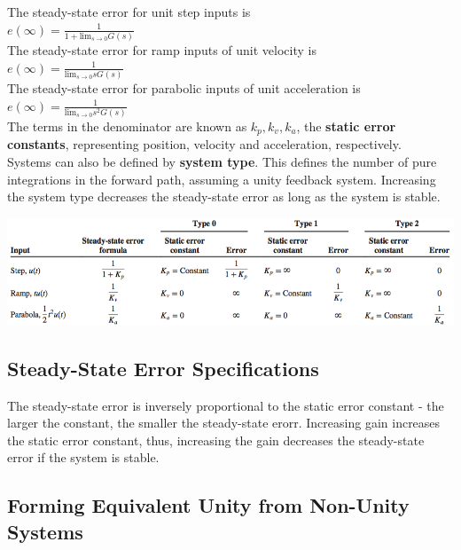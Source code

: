 \documentclass[11pt]{article}
\begin{document}
    The steady-state error for unit step inputs is \\ 

    $e(\infty) = \frac{1}{1 + \text{lim}_{s\rightarrow 0} G(s)}$ \\
    
    The steady-state error for ramp inputs of unit velocity is \\
    
    $e(\infty) = \frac{1}{\text{lim}_{s\rightarrow 0} sG(s)}$ \\

    The steady-state error for parabolic inputs of unit acceleration is \\
    
    $e(\infty) = \frac{1}{\text{lim}_{s\rightarrow 0} s^2G(s)}$ \\


    The terms in the denominator are known as $k_p, k_v, k_a$, the \textbf{static error constants}, representing position, velocity and acceleration, respectively. \\
    
    Systems can also be defined by \textbf{system type}. This defines the number of pure integrations in the forward path, assuming a unity feedback system. Increasing the system type decreases the steady-state error as long as the system is stable.

    \begin{center}
        \includegraphics[width=300 px]{img/types} \\
    \end{center}

    \subsection{Steady-State Error Specifications}

   The steady-state error is inversely proportional to the static error constant - the larger the constant, the smaller the steady-state erorr. Increasing gain increases the static error constant, thus, increasing the gain decreases the steady-state error if the system is stable.

   \subsection{Forming Equivalent Unity from Non-Unity Systems}
\end{document}
